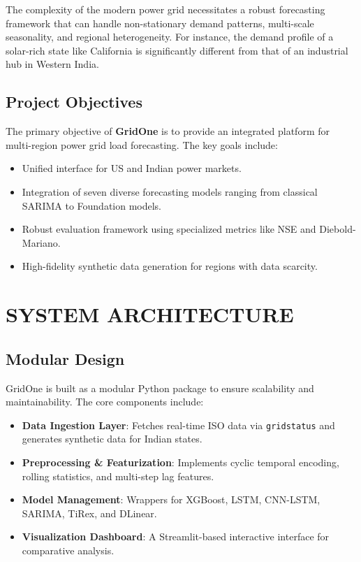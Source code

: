 \documentclass[12pt,a4paper,twoside,fleqn]{report}
\begin{document}
The complexity of the modern power grid necessitates a robust forecasting framework that can handle non-stationary demand patterns, multi-scale seasonality, and regional heterogeneity. For instance, the demand profile of a solar-rich state like California is significantly different from that of an industrial hub in Western India.

\section{Project Objectives}
The primary objective of \textbf{GridOne} is to provide an integrated platform for multi-region power grid load forecasting. The key goals include:
\begin{itemize}
    \item Unified interface for US and Indian power markets.
    \item Integration of seven diverse forecasting models ranging from classical SARIMA to Foundation models.
    \item Robust evaluation framework using specialized metrics like NSE and Diebold-Mariano.
    \item High-fidelity synthetic data generation for regions with data scarcity.
\end{itemize}

\chapter{SYSTEM ARCHITECTURE}
\section{Modular Design}
GridOne is built as a modular Python package to ensure scalability and maintainability. The core components include:
\begin{itemize}
    \item \textbf{Data Ingestion Layer}: Fetches real-time ISO data via \texttt{gridstatus} and generates synthetic data for Indian states.
    \item \textbf{Preprocessing & Featurization}: Implements cyclic temporal encoding, rolling statistics, and multi-step lag features.
    \item \textbf{Model Management}: Wrappers for XGBoost, LSTM, CNN-LSTM, SARIMA, TiRex, and DLinear.
    \item \textbf{Visualization Dashboard}: A Streamlit-based interactive interface for comparative analysis.
\end{itemize}
\end{document}
